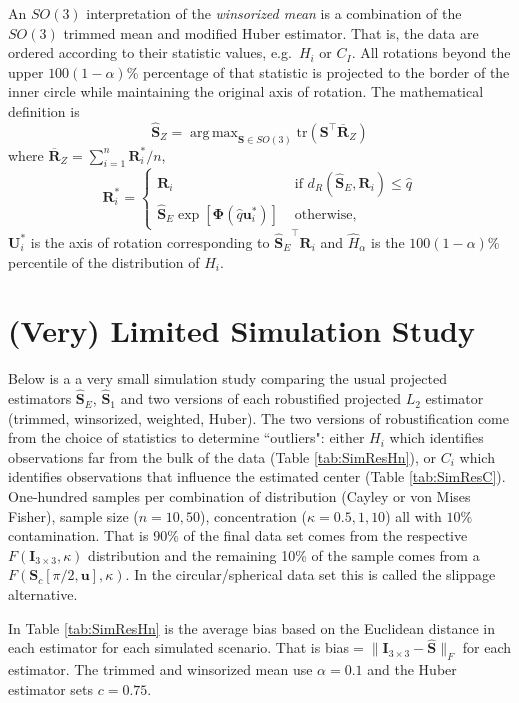 \documentclass{article}\usepackage[]{graphicx}\usepackage[]{color}
\DeclareMathOperator*{\argmax}{arg\,max}
\newcommand{\ProjMean}{{\widehat{\bm S}_{E}}}
\newcommand{\ProjMedian}{{\widehat{\bm S}_{1}}}
\newcommand{\WinzMean}{{\widehat{\bm S}_Z}}
\begin{document}
An $SO(3)$ interpretation of the \emph{winsorized mean} is a combination of the $SO(3)$ trimmed mean and modified Huber estimator.  That is, the data are ordered according to their statistic values, e.g.~$H_i$ or $C_I$.  All rotations beyond the upper $100(1-\alpha)$\% percentage of that statistic is projected to the border of the inner circle while maintaining the original axis of rotation.  The mathematical definition is 
\[
\WinzMean=\argmax_{\bm S\in SO(3)}\text{tr}(\bm S^\top\overline{\bm R}_{Z})
\]
where $\overline{\bm R}_{Z}=\sum_{i=1}^n\bm R_i^*/n$, 
\[
\bm R_i^*=
\begin{cases}
\bm R_i&\text{ if }d_R(\ProjMean,\bm R_i)\leq\hat{q}\\
\ProjMean\exp[\bm{\Phi}(\hat{q}\bm{u}_i^*)]&\text{ otherwise,}
\end{cases}
\]
$\bm U_i^*$ is the axis of rotation corresponding to $\ProjMean^\top\bm R_i$ and $\hat{H}_\alpha$ is the $100(1-\alpha)$\% percentile of the distribution of $H_i$.




\section{(Very) Limited Simulation Study}

Below is a a very small simulation study comparing the usual projected estimators $\ProjMean$, $\ProjMedian$ and two versions of each robustified projected $L_2$ estimator (trimmed, winsorized, weighted, Huber).  The two versions of robustification come from the choice of statistics to determine ``outliers": either $H_i$ which identifies observations far from the bulk of the data (Table \ref{tab:SimResHn}), or $C_i$ which identifies observations that influence the estimated center (Table \ref{tab:SimResC}).  One-hundred samples per combination of distribution (Cayley or von Mises Fisher), sample size ($n=10,50$), concentration ($\kappa=0.5,1,10$) all with $10\%$ contamination.  That is 90\% of the final data set comes from the respective $F(\bm I_{3\times 3},\kappa)$ distribution and the remaining 10\% of the sample comes from a $F(\bm S_c[\pi/2,\bm u],\kappa)$.  In the circular/spherical data set this is called the slippage alternative.

In Table \ref{tab:SimResHn} is the average bias based on the Euclidean distance in each estimator for each simulated scenario.  That is bias$=\|\bm I_{3\times 3}-\widehat{\bm S}\|_F$ for each estimator.  The trimmed and winsorized mean use $\alpha=0.1$ and the Huber estimator sets $c=0.75$.
\end{document}
